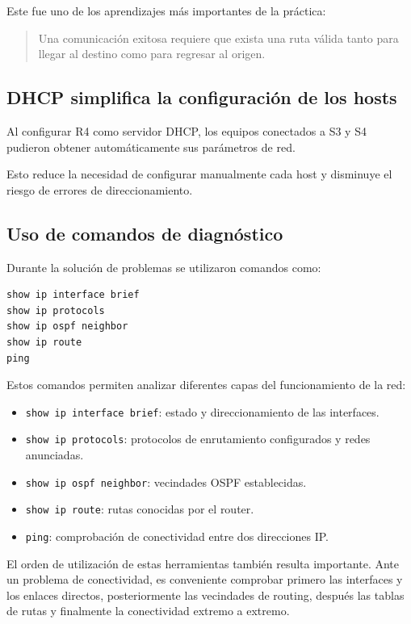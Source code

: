 \documentclass[12pt,a4paper]{article}
\begin{document}
Este fue uno de los aprendizajes más importantes de la práctica:

\begin{quote}
Una comunicación exitosa requiere que exista una ruta válida tanto para llegar al destino como para regresar al origen.
\end{quote}

\subsection{DHCP simplifica la configuración de los hosts}

Al configurar R4 como servidor DHCP, los equipos conectados a S3 y S4 pudieron obtener automáticamente sus parámetros de red.

Esto reduce la necesidad de configurar manualmente cada host y disminuye el riesgo de errores de direccionamiento.

\subsection{Uso de comandos de diagnóstico}

Durante la solución de problemas se utilizaron comandos como:

\begin{lstlisting}[style=cisco]
show ip interface brief
show ip protocols
show ip ospf neighbor
show ip route
ping
\end{lstlisting}

Estos comandos permiten analizar diferentes capas del funcionamiento de la red:

\begin{itemize}
\item \texttt{show ip interface brief}: estado y direccionamiento de las interfaces.
\item \texttt{show ip protocols}: protocolos de enrutamiento configurados y redes anunciadas.
\item \texttt{show ip ospf neighbor}: vecindades OSPF establecidas.
\item \texttt{show ip route}: rutas conocidas por el router.
\item \texttt{ping}: comprobación de conectividad entre dos direcciones IP.
\end{itemize}

El orden de utilización de estas herramientas también resulta importante. Ante un problema de conectividad, es conveniente comprobar primero las interfaces y los enlaces directos, posteriormente las vecindades de routing, después las tablas de rutas y finalmente la conectividad extremo a extremo.
\end{document}
